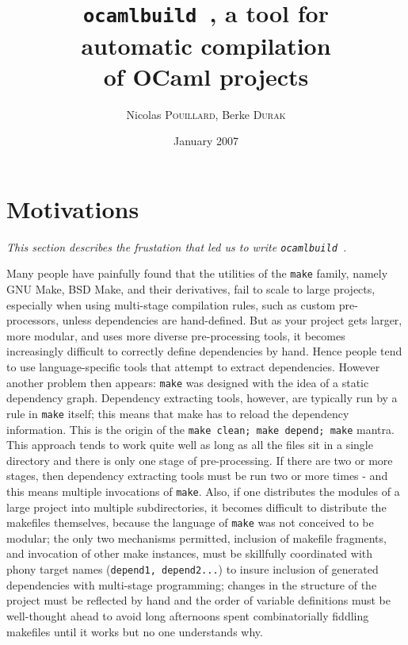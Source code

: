\documentclass[12pt]{article}
\newcommand{\ocb}{\texttt{ocamlbuild}~}
\begin{document}
\title{\ocb, a tool for \\ automatic compilation \\ of OCaml projects}
\author{Nicolas \textsc{Pouillard}, Berke \textsc{Durak}}
\date{January 2007}
\maketitle
\begin{abstract}
\end{abstract}
\section{Motivations}
{\em This section describes the frustation that led us to write \ocb.}

Many people have painfully found that the utilities of the \texttt{make}
family, namely GNU Make, BSD Make, and their derivatives, fail to scale to
large projects, especially when using multi-stage compilation rules, such as
custom pre-processors, unless dependencies are hand-defined.  But as your
project gets larger, more modular, and uses more diverse pre-processing tools,
it becomes increasingly difficult to correctly define dependencies by hand.
Hence people tend to use language-specific tools that attempt to extract
dependencies.  However another problem then appears: \texttt{make} was designed
with the idea of a static dependency graph.  Dependency extracting tools,
however, are typically run by a rule in \texttt{make} itself; this means that
make has to reload the dependency information.  This is the origin of the
\texttt{make clean; make depend; make} mantra.  This approach tends to work
quite well as long as all the files sit in a single directory and there is only
one stage of pre-processing.  If there are two or more stages, then dependency
extracting tools must be run two or more times - and this means multiple
invocations of \texttt{make}.  Also, if one distributes the modules of a large
project into multiple subdirectories, it becomes difficult to distribute the
makefiles themselves, because the language of \texttt{make} was not conceived
to be modular; the only two mechanisms permitted, inclusion of makefile
fragments, and invocation of other make instances, must be skillfully
coordinated with phony target names (\texttt{depend1, depend2...}) to insure
inclusion of generated dependencies with multi-stage programming; changes in
the structure of the project must be reflected by hand and the order of
variable definitions must be well-thought ahead to avoid long afternoons spent
combinatorially fiddling makefiles until it works but no one understands why.
\end{document}
